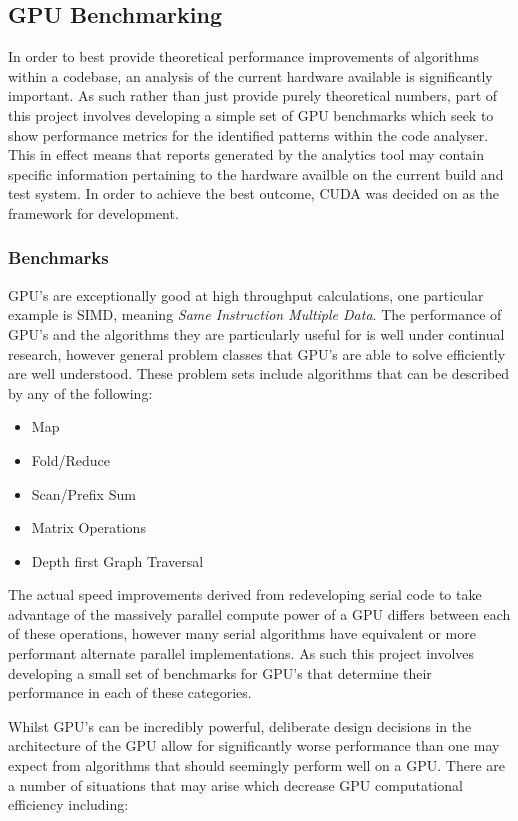 \subsection{GPU Benchmarking}
In order to best provide theoretical performance improvements of algorithms within a codebase, an analysis of the current hardware available is significantly important. As such rather than just provide purely theoretical numbers, part of this project involves developing a simple set of GPU benchmarks which seek to show performance metrics for the identified patterns within the code analyser. This in effect means that reports generated by the analytics tool may contain specific information pertaining to the hardware availble on the current build and test system. In order to achieve the best outcome, CUDA was decided on as the framework for development.

\subsubsection{Benchmarks}
GPU's are exceptionally good at high throughput calculations, one particular example is SIMD, meaning \emph{Same Instruction Multiple Data}. The performance of GPU's and the algorithms they are particularly useful for is well under continual research, however general problem classes that GPU's are able to solve efficiently are well understood. These problem sets include algorithms that can be described by any of the following:

\begin{itemize}
\item Map
\item Fold/Reduce
\item Scan/Prefix Sum
\item Matrix Operations
\item Depth first Graph Traversal
\end{itemize}

The actual speed improvements derived from redeveloping serial code to take advantage of the massively parallel compute power of a GPU differs between each of these operations, however many serial algorithms have equivalent or more performant alternate parallel implementations. As such this project involves developing a small set of benchmarks for GPU's that determine their performance in each of these categories.

Whilst GPU's can be incredibly powerful, deliberate design decisions in the architecture of the GPU allow for significantly worse performance than one may expect from algorithms that should seemingly perform well on a GPU. There are a number of situations that may arise which decrease GPU computational efficiency including:


